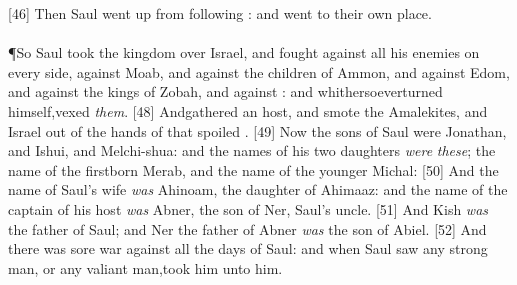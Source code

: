 [46] \textcolor[cmyk]{0.99998,1,0,0}{Then Saul went up from following  : and   went to their own place.}\\
\\
\P \textcolor[cmyk]{0.99998,1,0,0}{So Saul took the kingdom over Israel, and fought against all his enemies on every side, against Moab, and against the children of Ammon, and against Edom, and against the kings of Zobah, and against  : and whithersoeverturned himself,vexed \emph{them}.}
[48] \textcolor[cmyk]{0.99998,1,0,0}{Andgathered an host, and smote the Amalekites, and  Israel out of the hands of  that spoiled .}
[49] \textcolor[cmyk]{0.99998,1,0,0}{Now the sons of Saul were Jonathan, and Ishui, and Melchi-shua: and the names of his two daughters \emph{were} \emph{these}; the name of the firstborn Merab, and the name of the younger Michal:}
[50] \textcolor[cmyk]{0.99998,1,0,0}{And the name of Saul's wife \emph{was} Ahinoam, the daughter of Ahimaaz: and the name of the captain of his host \emph{was} Abner, the son of Ner, Saul's uncle.}
[51] \textcolor[cmyk]{0.99998,1,0,0}{And Kish \emph{was} the father of Saul; and Ner the father of Abner \emph{was} the son of Abiel.}
[52] \textcolor[cmyk]{0.99998,1,0,0}{And there was sore war against   all the days of Saul: and when Saul saw any strong man, or any valiant man,took him unto him.}